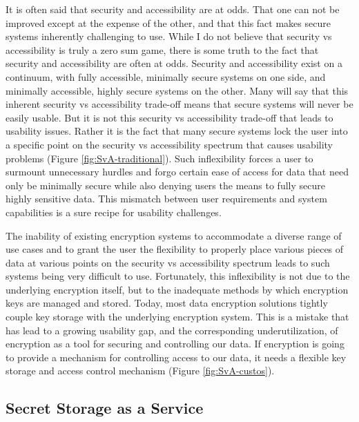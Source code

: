 It is often said that security and accessibility are at odds. That one
can not be improved except at the expense of the other, and that this
fact makes secure systems inherently challenging to use. While I do
not believe that security vs accessibility is truly a zero sum game,
there is some truth to the fact that security and accessibility are
often at odds. Security and accessibility exist on a continuum, with
fully accessible, minimally secure systems on one side, and minimally
accessible, highly secure systems on the other. Many will say that
this inherent security vs accessibility trade-off means that secure
systems will never be easily usable. But it is not this security vs
accessibility trade-off that leads to usability issues. Rather it is
the fact that many secure systems lock the user into a specific point
on the security vs accessibility spectrum that causes usability
problems (Figure \ref{fig:SvA-traditional}). Such inflexibility forces
a user to surmount unnecessary hurdles and forgo certain ease of
access for data that need only be minimally secure while also denying
users the means to fully secure highly sensitive data. This mismatch
between user requirements and system capabilities is a sure recipe for
usability challenges.

The inability of existing encryption systems to accommodate a diverse
range of use cases and to grant the user the flexibility to properly
place various pieces of data at various points on the security vs
accessibility spectrum leads to such systems being very difficult to
use. Fortunately, this inflexibility is not due to the underlying
encryption itself, but to the inadequate methods by which encryption
keys are managed and stored. Today, most data encryption solutions
tightly couple key storage with the underlying encryption system. This
is a mistake that has lead to a growing usability gap, and the
corresponding underutilization, of encryption as a tool for securing
and controlling our data. If encryption is going to provide a
mechanism for controlling access to our data, it needs a flexible key
storage and access control mechanism (Figure \ref{fig:SvA-custos}).

\subsection{Secret Storage as a Service}

